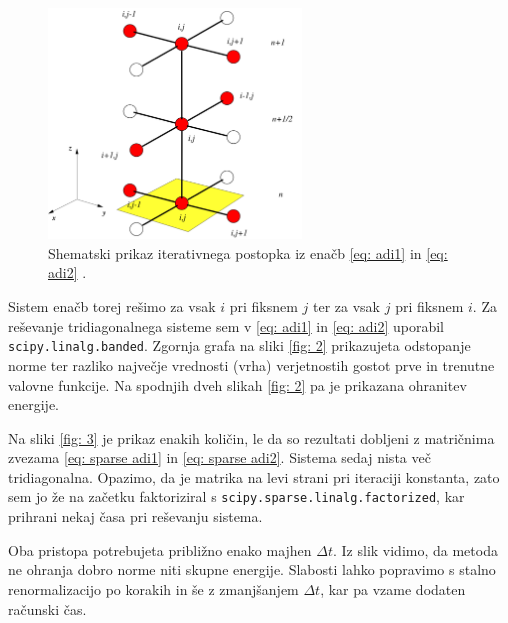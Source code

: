 \documentclass[11pt]{report}
\begin{document}
\begin{figure}[h!]
	\centering
	\includegraphics[width=0.6\textwidth]{adi.png}
	\caption{Shematski prikaz iterativnega postopka iz enačb \ref{eq: adi1} in \ref{eq: adi2} \cite{adi wiki}.}
	\label{fig: 1}
\end{figure}

\noindent
Sistem enačb torej rešimo za vsak $i$ pri fiksnem $j$ ter za vsak $j$ pri fiksnem $i$.
Za reševanje tridiagonalnega sisteme sem v \ref{eq: adi1} in \ref{eq: adi2} uporabil \texttt{scipy.linalg.banded}.
Zgornja grafa na sliki \ref{fig: 2} prikazujeta odstopanje norme ter razliko največje vrednosti (vrha) verjetnostih gostot
prve in trenutne valovne funkcije. Na spodnjih dveh slikah \ref{fig: 2} pa je prikazana ohranitev energije.

Na sliki \ref{fig: 3} je prikaz enakih količin, le da so rezultati dobljeni z matričnima zvezama
\ref{eq: sparse adi1} in \ref{eq: sparse adi2}. Sistema sedaj nista več tridiagonalna.
Opazimo, da je matrika na levi strani pri iteraciji konstanta, zato sem jo že na začetku
faktoriziral s \texttt{scipy.sparse.linalg.factorized}, kar prihrani nekaj časa pri reševanju sistema.

Oba pristopa potrebujeta približno enako majhen $\Delta t$. Iz slik vidimo, da metoda ne ohranja dobro norme
niti skupne energije.
Slabosti lahko popravimo s stalno renormalizacijo po korakih in še z zmanjšanjem $\Delta t$, kar pa vzame dodaten
računski čas.

\newpage
\end{document}
